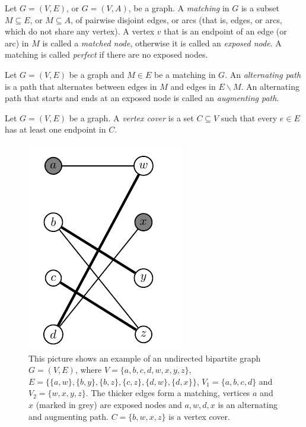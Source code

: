 \begin{definition}[Matching]
   Let $G=(V,E)$, or $G=(V,A)$, be a graph. A \emph{matching} 
   in $G$ is a subset $M \subseteq E$, or $M \subseteq A$, of
   pairwise disjoint edges, or arcs (that is, edges, or arcs,
   which do not share any vertex).
   A vertex $v$ that is an endpoint of an edge (or arc) in 
   $M$ is called a \emph{matched node}, otherwise it is 
   called an \emph{exposed node}.
   A matching is called \emph{perfect} if there are no
   exposed nodes.
\end{definition}

\begin{definition}
   Let $G=(V,E)$ be a graph and $M \in E$ be a matching in $G$.
   An \emph{alternating path} is a path that alternates between
   edges in $M$ and edges in $E \backslash M$. An alternating
   path that starts and ends at an exposed node is called an
   \emph{augmenting path}.
\end{definition}

\begin{definition}
   Let $G=(V,E)$ be a graph. A \emph{vertex cover} is a
   set $C \subseteq V$ such that every $e \in E$ has at least
   one endpoint in $C$.
\end{definition}

\begin{figure}[htbp]
  \begin{center}
   \includegraphics{figures/bipartite-graph.pdf}
  \end{center}
    \caption{This picture shows an example of an undirected
    bipartite graph $G=(V,E)$, where $V = \{a,b,c,d,w,x,y,z\}$,
    $E=\{\{a,w\},\{b,y\},\{b,z\},\{c,z\},\{d,w\},\{d,x\}\}$,
    $V_1=\{a,b,c,d\}$ and $V_2=\{w,x,y,z\}$. 
    The thicker edges form a matching, vertices $a$ and $x$ 
    (marked in grey) are exposed nodes and $a,w,d,x$ is an 
    alternating and augmenting path. $C=\{b,w,x,z\}$ is a vertex 
    cover.}
    \label{fig:bipgraph}
\end{figure}

